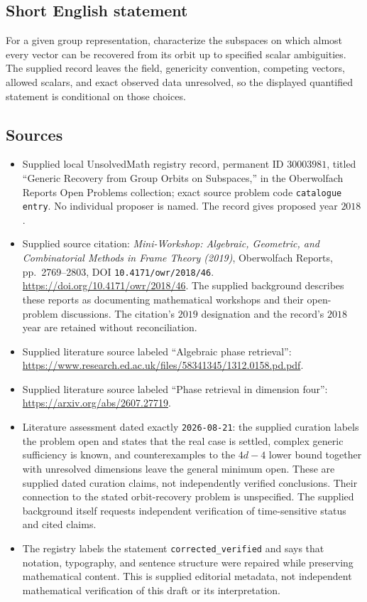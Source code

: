 \documentclass[11pt]{article}
\begin{document}
\subsection{Short English statement}
For a given group representation, characterize the subspaces on which almost every vector can be recovered from its orbit up to specified scalar ambiguities. The supplied record leaves the field, genericity convention, competing vectors, allowed scalars, and exact observed data unresolved, so the displayed quantified statement is conditional on those choices.
\subsection{Sources}
\begin{itemize}
\item Supplied local UnsolvedMath registry record, permanent ID \(30003981\), titled ``Generic Recovery from Group Orbits on Subspaces,'' in the Oberwolfach Reports Open Problems collection; exact source problem code \texttt{catalogue entry}. No individual proposer is named. The record gives proposed year \(2018\).
\item Supplied source citation: \emph{Mini-Workshop: Algebraic, Geometric, and Combinatorial Methods in Frame Theory (2019)}, Oberwolfach Reports, pp.~2769--2803, DOI \texttt{10.4171/owr/2018/46}. \url{https://doi.org/10.4171/owr/2018/46}. The supplied background describes these reports as documenting mathematical workshops and their open-problem discussions. The citation's \(2019\) designation and the record's \(2018\) year are retained without reconciliation.
\item Supplied literature source labeled ``Algebraic phase retrieval'': \url{https://www.research.ed.ac.uk/files/58341345/1312.0158.pd.pdf}.
\item Supplied literature source labeled ``Phase retrieval in dimension four'': \url{https://arxiv.org/abs/2607.27719}.
\item Literature assessment dated exactly \texttt{2026-08-21}: the supplied curation labels the problem open and states that the real case is settled, complex generic sufficiency is known, and counterexamples to the \(4d-4\) lower bound together with unresolved dimensions leave the general minimum open. These are supplied dated curation claims, not independently verified conclusions. Their connection to the stated orbit-recovery problem is unspecified. The supplied background itself requests independent verification of time-sensitive status and cited claims.
\item The registry labels the statement \texttt{corrected\_verified} and says that notation, typography, and sentence structure were repaired while preserving mathematical content. This is supplied editorial metadata, not independent mathematical verification of this draft or its interpretation.
\end{itemize}
\end{document}
